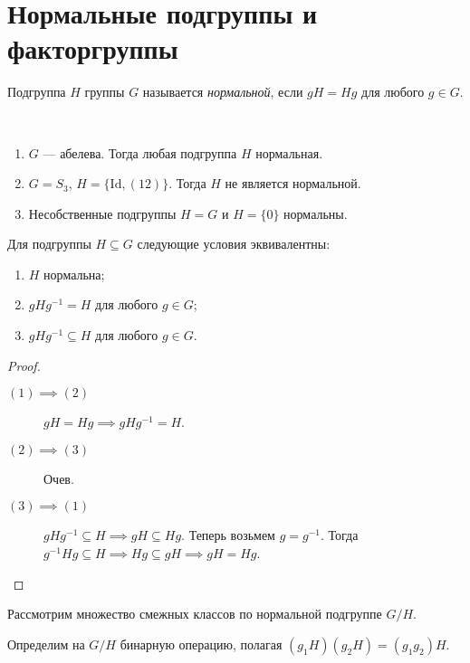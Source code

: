 \section{Нормальные подгруппы и факторгруппы}

\begin{definition}
    Подгруппа $H$ группы $G$ называется \textit{нормальной}, если $gH = Hg$ для любого $g \in G$.
\end{definition}

\begin{example}~
    \begin{enumerate}
    \item $G$ --- абелева. Тогда любая подгруппа $H$ нормальная.
    \item $G = S_3$, $H = \{\mathrm{Id}, (12)\}$. Тогда $H$ не является нормальной.
    \item Несобственные подгруппы $H = G$ и $H = \{0\}$ нормальны.
    \end{enumerate}
\end{example}

\begin{proposal}
    Для подгруппы $H \subseteq G$ следующие условия эквивалентны:
    \begin{enumerate}
    \item $H$ нормальна;
    \item $g H g^{-1} = H$ для любого $g \in G$;
    \item $g H g^{-1} \subseteq H$ для любого $g \in G$. 
    \end{enumerate}
\end{proposal}

\begin{proof}~
    \begin{description}
        \item[$(1) \implies (2)$] $gH = Hg \implies gHg^{-1} = H$.
        \item[$(2) \implies (3)$] Очев.
        \item[$(3) \implies (1)$] $gHg^{-1} \subseteq H \implies gH \subseteq Hg$. Теперь возьмем $g = g^{-1}$. Тогда $g^{-1} H g \subseteq H \implies Hg \subseteq gH \implies gH = Hg$.
            \qedhere
    \end{description}
\end{proof}

\bigskip
Рассмотрим множество смежных классов по нормальной подгруппе $G / H$.

Определим на $G / H$ бинарную операцию, полагая $(g_1 H)(g_2 H) = (g_1 g_2) H$.

